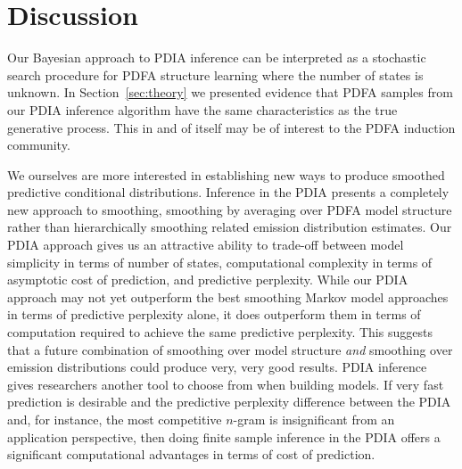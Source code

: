 \section{Discussion}
\label{sec:discussion}

Our Bayesian approach to PDIA inference can be interpreted as a stochastic search procedure for PDFA structure learning where the number of states is unknown.  In Section~\ref{sec:theory} we presented evidence that PDFA samples from our PDIA inference algorithm have the same characteristics as the true generative process.  This in and of itself may be of interest to the PDFA induction community.  

We ourselves are more interested in establishing new ways to produce smoothed predictive conditional distributions.  Inference in the PDIA presents a completely new approach to smoothing, smoothing by averaging over PDFA model structure rather than hierarchically smoothing related emission distribution estimates.   Our PDIA approach gives us an attractive ability to trade-off between model simplicity in terms of number of states, computational complexity in terms of asymptotic cost of prediction, and predictive perplexity.  While our PDIA approach may not yet outperform the best smoothing Markov model approaches in terms of predictive perplexity alone, it does outperform them in terms of computation required to achieve the same predictive perplexity.  This suggests that a future combination of smoothing over model structure {\em and} smoothing over emission distributions could produce very, very good results.  PDIA inference gives researchers another tool to choose from when building models.  If very fast prediction is desirable and the predictive perplexity difference between the PDIA and, for instance, the most competitive $n$-gram is insignificant from an application perspective, then doing finite sample inference in the PDIA offers a significant computational advantages in terms of cost of prediction.

